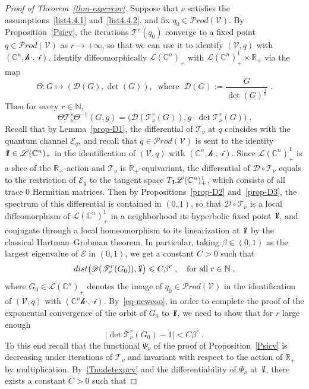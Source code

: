 \documentclass[11pt]{article}
\theoremstyle{definition}
\numberwithin{equation}{section}
\numberwithin{figure}{section}
\numberwithin{table}{section}
\let\cal\mathscr
\newcommand{\R}{{\mathbb{R}}}
\newcommand{\N}{{\mathbb{N}}}
\newcommand{\CCC}{{\mathbb{C}}}
\newcommand{\cE}{{\mathcal{E}}}
\newcommand{\cV}{{\mathcal{V}}}
\newcommand*\id{{1\hskip-2.5pt{\rm l}}}
\renewcommand\leq {\leqslant}
\newcommand\< {\mathcal{h}}
\renewcommand\> {\mathcal{i}}
\newcommand\TT {{\cal T}}
\newcommand*\cD{\mathscr{D}}
\newcommand*\cL{\mathscr{L}}
\newcommand{\Prod}{{\mathcal Prod}}
\begin{document}
\begin{proof}[Proof of Theorem~\ref{thm-expcvcor}]
Suppose that $\nu$ satisfies the assumptions~\eqref{list4.4.1} and~\eqref{list4.4.2}, and fix $q_0\in\Prod(\cV)$. By Proposition~\ref{Psicv}, the iterations $\TT^r(q_0)$ converge to a fixed point $q\in\Prod(\cV)$ as $r \to +\infty$, so that we can use it to identify $(\cV,q)$ with $(\CCC^n,\<\cdot,\cdot\>)$. Identify diffeomorphically $\cL(\CCC^n)_+$ with $\cL(\CCC^n)_+^1 \times \R_+$ via the map
\[
\Theta: G \longmapsto\left(\cD(G),\det(G)\right),\;\;\text{where}\;\; \cD(G):=\frac{G}{\det(G)^{\frac{1}{n}}}\;.
\]
Then for every $r \in \N$,
\begin{equation}\label{eq-newcoo}
\Theta \TT^r_\nu \Theta^{-1} (G,g) =\big(\cD(\TT^r_\nu(G)), g \cdot \det\TT^r_\nu(G)\big)\;.
\end{equation}
Recall that by Lemma~\ref{prop-D1}, the differential of $\TT_\nu$ at $q$ coincides with the quantum channel $\cE_q$, and recall that $q\in\Prod(\cV)$ is sent to the identity $\id\in\cL(\CCC^n)_+$ in the identification of $(\cV,q)$ with $(\CCC^n,\<\cdot,\cdot\>)$. Since $\cL(\CCC^n)^1_+$ is a slice of the $\R_+$-action and $\TT_\nu$ is $\R_+$-equivariant, the differential of $\cD \circ \TT_\nu$ equals to the restriction of $\cE_q$ to the tangent space $T_\id\cL(\CCC^n)_+^1$, which consists of all trace $0$ Hermitian matrices. Then by Propositions~\ref{prop-D2} and~\ref{prop-D3}, the spectrum of this differential is contained in $(0,1)$, so that $\cD \circ \TT_\nu$ is a local diffeomorphism of $\cL(\CCC^n)_+^1$ in a neighborhood its hyperbolic fixed point $\id$, and conjugate through a local homeomorphism to its linearization at $\id$ by the classical Hartman--Grobman theorem. In particular, taking $\beta\in(0,1)$ as the largest eigenvalue of $\cE$ in $(0,1)$, we get a constant $C>0$ such that
\begin{equation}\label{Tnudetexpcv}
\textup{dist}
\big(\cD (\TT_\nu^r(G_0)),\id
\big)\leq C\beta^r\;,\quad\text{for all}\; r\in\N\;,
\end{equation}
where $G_0\in\cL(\CCC^n)_+$ denotes the image of $q_0\in\Prod(\cV)$ in the identification of $(\cV,q)$ with $(\CCC^n\<\cdot,\cdot\>)$. By~\eqref{eq-newcoo}, in order to complete the proof of the exponential convergence of the orbit of $G_0$ to $\id$, we need to show that for $r$ large enough
\begin{equation}\label{detcv}
\big|\det \TT^r_\nu(G_0)-1\big|<C\beta^r\;.
\end{equation}
To this end recall that the functional $\Psi_\nu$ of the proof of Proposition~\ref{Psicv} is decreasing under iterations of $\TT_\nu$ and invariant with respect to the action of $\R_+$ by multiplication. By~\eqref{Tnudetexpcv} and the differentiability of $\Psi_\nu$ at $\id$, there exists a constant $C>0$ such that

\end{proof}
\end{document}
